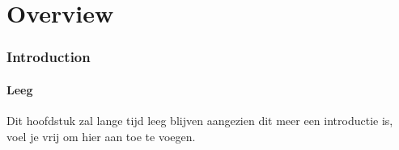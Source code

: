 
\part{Overview}
\section{Introduction}

\subsection{Leeg}
Dit hoofdstuk zal lange tijd leeg blijven aangezien dit meer een introductie is, voel je vrij om hier aan toe te voegen.

